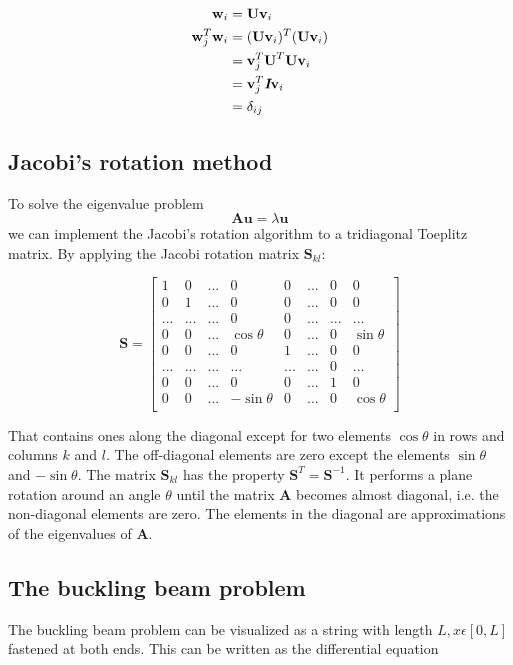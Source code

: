 \documentclass{article}
\begin{document}
\begin{align*}
    \textbf{w}_i & = \textbf{U}\textbf{v}_i \\
    \textbf{w}_j^T\textbf{w}_i & = (\textbf{U}\textbf{v}_i)^T(\textbf{U}\textbf{v}_i) \\
    & = \textbf{v}_j^T\textbf{U}^T\textbf{U}\textbf{v}_i \\
    & = \textbf{v}_j^T \textit{\textbf{I}}  \textbf{v}_i \\
    & = \delta_{ij}
\end{align*}


\subsection{Jacobi's rotation method}
To solve the eigenvalue problem
\begin{equation}
    \mathbf{Au} = \lambda \mathbf{u}
    \label{eq:eigen}
\end{equation}
we can implement the Jacobi's rotation algorithm to a tridiagonal Toeplitz matrix. By applying the Jacobi rotation matrix $\textbf{S}_{kl}$:


\[
\textbf{S} = 
\begin{bmatrix}
    1 & 0 & ... & 0 & 0 & ... & 0 & 0 \\
    0 & 1 & ... & 0 & 0 & ... & 0 & 0 \\
    ... & ... & ... & 0 & 0 & ... & ... & ... \\
    0 & 0 & ... & \cos\theta & 0 & ... & 0 & \sin\theta \\
    0 & 0 & ... & 0 & 1 & ... & 0 & 0 \\
    ... & ... & ... & ... & ... & ... & 0 & ... \\
    0 & 0 & ... & 0 & 0 & ... & 1 & 0 \\
    0 & 0 & ... & -\sin\theta & 0 & ... & 0 & \cos\theta \\
\end{bmatrix}
\]

That contains ones along the diagonal except for two elements $\cos\theta$ in rows and columns $k$ and $l$. The off-diagonal elements are zero except the elements $\sin\theta$ and $-\sin\theta$. The matrix  $\textbf{S}_{kl}$ has the property $\textbf{S}^T = \textbf{S}^{-1}$. It performs a plane rotation around an angle $\theta$ until the matrix $\textbf{A}$ becomes almost diagonal, i.e. the non-diagonal elements are zero. The elements in the diagonal are approximations of the eigenvalues of $\textbf{A}$.

\subsection{The buckling beam problem}
The buckling beam problem can be visualized as a string with length $L, x \epsilon [0,L]$ fastened at both ends. This can be written as the differential equation
\end{document}
